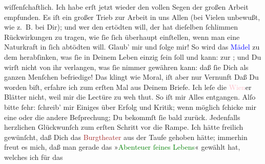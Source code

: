                wiſſenſchaftlich. Ich habe erſt jetzt wieder den vollen Segen der großen Arbeit
               empfunden. Es iſt ein großer Trieb zur {\pb}Arbeit in
               uns Allen (bei Vielen unbewußt, wie z. B. bei Dir); und wer den  ertödten will, der hat dieſelben ſchlimmen
               Rückwirkungen zu tragen, wie ſie ſich überhaupt einſtellen, wenn man eine Naturkraft
               in ſich abtödten will. Glaub’ mir und ſolge mir! So wird das \textcolor{blue}{Mädel}{} zu dem herabſinken, was
               ſie in Deinem Leben einzig ſein ſoll und kann: zur \label{K_L02661-111v}\label{K_L02661-111h}; und Du wirſt nicht
               von ihr verlangen, was ſie nimmer gewähren kann: daß ſie Dich als ganzen Menſchen
               befriedige! Das klingt wie Moral, iſt aber nur Vernunft{\dotsfive}\pend
           \pstart
           Daß Du \label{K_L02661-2v}\label{K_L02661-2h} worden biſt, erfahre ich zum erſten Mal aus Deinem
               Briefe. Ich leſe die \textcolor{pink}{Wien}{}\ledrightnote{\textcolor{pink}{Wien}}er Blätter nicht, weil
               mir die Lectüre zu weh thut. So iſt mir Alles entgangen. Alſo bitte ſehr: ſchreib’
               mir Einiges {\pb}über Erfolg und Kritik; wenn möglich
               ſchicke mir eine oder die andere Beſprechung; Du bekommſt ſie bald zurück. Jedenfalls
               herzlichen Glückwunſch zum erſten Schritt vor die Rampe. Ich hätte freilich
               gewünſcht, daß Dich das \textcolor{brown}{Burgtheater}{}\ledrightnote{\textcolor{brown}{Burgtheater}} aus der Taufe
               gehoben hätte; immerhin freut es mich, daß man gerade das »\textcolor{green}{Abenteuer ſeines Lebens}{}\ledrightnote{\textcolor{green}{Das Abenteuer seines Lebens}}« gewählt hat, welches ich für das
